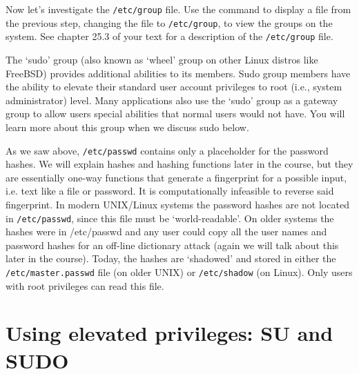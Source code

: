 \documentclass{article}
\begin{document}
\medskip

\medskip

\medskip

\medskip

Now let’s investigate the {\tt /etc/group} file. Use the command to display a file from the previous step, changing the file to {\tt /etc/group}, to view the groups on the system. See chapter 25.3 of your text for a description of the {\tt /etc/group} file. \medskip

\medskip

\medskip

The ‘sudo’ group (also known as ‘wheel’ group on other Linux distros like FreeBSD) provides additional abilities to its members. Sudo group members have the ability to elevate their standard user account privileges to root (i.e., system administrator) level. Many applications also use the ‘sudo’ group as a gateway group to allow users special abilities that normal users would not have. You will learn more about this group when we discuss sudo below. 

As we saw above, {\tt /etc/passwd} contains only a placeholder for the password hashes.  We will explain hashes and hashing functions later in the course, but they are essentially one-way functions that generate a fingerprint for a possible input, i.e. text like a file or password.  It is computationally infeasible to reverse said fingerprint. In modern UNIX/Linux systems the password hashes are not located in {\tt /etc/passwd}, since this file must be ‘world-readable’. On older systems the hashes were in /etc/passwd and any user could copy all the user names and password hashes for an off-line dictionary attack (again we will talk about this later in the course). Today, the hashes are ‘shadowed’ and stored in either the {\tt /etc/master.passwd} file (on older UNIX) or {\tt /etc/shadow} (on Linux). Only users with root privileges can read this file. 

\section{Using elevated privileges: SU and SUDO}
\end{document}
